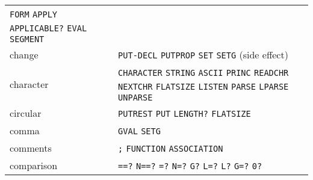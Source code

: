\documentclass[a4paper,]{article}
\begin{document}
\begin{longtable}[]{@{}ll@{}}
\begin{minipage}[t]{0.83\columnwidth}
\texttt{FORM} \texttt{APPLY} \texttt{APPLICABLE?} \texttt{EVAL} \texttt{SEGMENT}\strut
\end{minipage}\tabularnewline
\begin{minipage}[t]{0.11\columnwidth}\raggedright\strut
change\strut
\end{minipage} & \begin{minipage}[t]{0.83\columnwidth}\raggedright\strut
\texttt{PUT-DECL} \texttt{PUTPROP} \texttt{SET} \texttt{SETG} (side effect)\strut
\end{minipage}\tabularnewline
\begin{minipage}[t]{0.11\columnwidth}\raggedright\strut
character\strut
\end{minipage} & \begin{minipage}[t]{0.83\columnwidth}\raggedright\strut
\texttt{CHARACTER} \texttt{STRING} \texttt{ASCII} \texttt{PRINC} \texttt{READCHR} \texttt{NEXTCHR} \texttt{FLATSIZE}
\texttt{LISTEN} \texttt{PARSE} \texttt{LPARSE} \texttt{UNPARSE}\strut
\end{minipage}\tabularnewline
\begin{minipage}[t]{0.11\columnwidth}\raggedright\strut
circular\strut
\end{minipage} & \begin{minipage}[t]{0.83\columnwidth}\raggedright\strut
\texttt{PUTREST} \texttt{PUT} \texttt{LENGTH?} \texttt{FLATSIZE}\strut
\end{minipage}\tabularnewline
\begin{minipage}[t]{0.11\columnwidth}\raggedright\strut
comma\strut
\end{minipage} & \begin{minipage}[t]{0.83\columnwidth}\raggedright\strut
\texttt{GVAL} \texttt{SETG}\strut
\end{minipage}\tabularnewline
\begin{minipage}[t]{0.11\columnwidth}\raggedright\strut
comments\strut
\end{minipage} & \begin{minipage}[t]{0.83\columnwidth}\raggedright\strut
\texttt{;} \texttt{FUNCTION} \texttt{ASSOCIATION}\strut
\end{minipage}\tabularnewline
\begin{minipage}[t]{0.11\columnwidth}\raggedright\strut
comparison\strut
\end{minipage} & \begin{minipage}[t]{0.83\columnwidth}\raggedright\strut
\texttt{==?} \texttt{N==?} \texttt{=?} \texttt{N=?} \texttt{G?} \texttt{L=?} \texttt{L?} \texttt{G=?} \texttt{0?}

\end{minipage}
\end{longtable}
\end{document}
